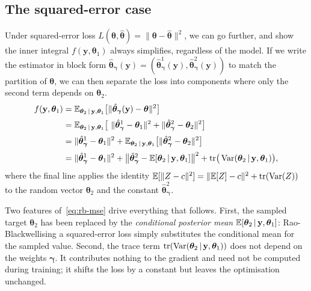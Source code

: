 \subsection{The squared-error case}
\label{sec:rb-mse}

Under squared-error loss $L(\bm{\theta}, \hat{\bm{\theta}}) = \|\bm{\theta} - \hat{\bm{\theta}}\|^2$, 
we can go further, and show the inner integral $f(\mathbf{y}, \bm{\theta}_1)$ always simplifies, regardless of the model.
If we write the estimator in block form
$\hat{\bm{\theta}}_{\bm{\gamma}}(\mathbf{y}) =
(\hat{\bm{\theta}}_{\bm{\gamma}}^{1}(\mathbf{y}),
\hat{\bm{\theta}}_{\bm{\gamma}}^{2}(\mathbf{y}))$ to match the partition of
$\bm{\theta}$, we can then separate the loss into components where only the
second term depends on $\bm{\theta}_2$.
%
\begin{align}
  f(\mathbf{y}, \bm{\theta}_1)
  &= \mathbb{E}_{\bm{\theta}_2 \,|\, \mathbf{y}, \bm{\theta}_1}
     \big[\|\hat{\bm{\theta}}_{\bm{\gamma}}(\mathbf{y}) - \bm{\theta} \|^2\big]
   \notag \\[2pt]
   &= \mathbb{E}_{\bm{\theta}_2 \,|\, \mathbf{y}, \bm{\theta}_1}
     \big[\ \|\hat{\bm{\theta}}_{\bm{\gamma}}^{1} - \bm{\theta}_1\|^2 + \|\hat{\bm{\theta}}_{\bm{\gamma}}^{2} - \bm{\theta}_2\|^2\big]
   \notag \\[2pt]
  &= \|\hat{\bm{\theta}}_{\bm{\gamma}}^{1} - \bm{\theta}_1\|^2
   + \mathbb{E}_{\bm{\theta}_2 \,|\, \mathbf{y}, \bm{\theta}_1}
     \big[\|\hat{\bm{\theta}}_{\bm{\gamma}}^{2} - \bm{\theta}_2\|^2\big]
   \notag \\[2pt]
  &= \|\hat{\bm{\theta}}_{\bm{\gamma}}^{1} - \bm{\theta}_1\|^2
   + \big\|\hat{\bm{\theta}}_{\bm{\gamma}}^{2} - \mathbb{E}[\bm{\theta}_2 \,|\, \mathbf{y}, \bm{\theta}_1]\big\|^2
   + \operatorname{tr}\!\big(\operatorname{Var}(\bm{\theta}_2 \,|\, \mathbf{y}, \bm{\theta}_1)
     \big),
  \label{eq:rb-mse}
\end{align}
%
where the final line applies the identity
$\mathbb{E}[\|Z - c\|^2] = \|\mathbb{E}[Z] - c\|^2 + \operatorname{tr}(\operatorname{Var}(Z))$ to the random
vector $\bm{\theta}_2$ and the constant
$\hat{\bm{\theta}}_{\bm{\gamma}}^{2}$.

Two features of~\eqref{eq:rb-mse} drive everything that follows.
First, the sampled target $\bm{\theta}_2$ has been replaced by the
\emph{conditional posterior mean}
$\mathbb{E}[\bm{\theta}_2 \,|\, \mathbf{y}, \bm{\theta}_1]$:
Rao-Blackwellising a squared-error loss simply substitutes the
conditional mean for the sampled value. Second, the trace term
$\operatorname{tr}(\operatorname{Var}(\bm{\theta}_2 \,|\, \mathbf{y}, \bm{\theta}_1))$ does not
depend on the weights $\bm{\gamma}$. It contributes nothing to the
gradient and need not be computed during training; it shifts the loss
by a constant but leaves the optimisation unchanged.

